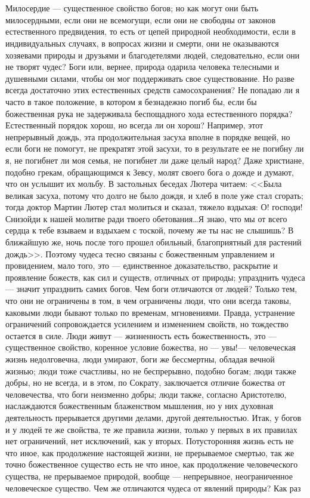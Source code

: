 \documentclass[12pt,oneside]{book}
\begin{document}
\chapter{}

Милосердие --- существенное свойство богов; но как могут они быть милосердными, если они не всемогущи, если они не свободны от законов естественного предвидения, то есть от цепей природной необходимости, если в индивидуальных случаях, в вопросах жизни и смерти, они не оказываются хозяевами природы и друзьями и благодетелями людей, следовательно, если они не творят чудес? Боги или, вернее, природа одарила человека телесными и душевными силами, чтобы он мог поддерживать свое существование. Но разве всегда достаточно этих естественных средств самосохранения? Не попадаю ли я часто в такое положение, в котором я безнадежно погиб бы, если бы божественная рука не задерживала беспощадного хода естественного порядка? Естественный порядок хорош, но всегда ли он хорош? Например, этот непрерывный дождь, эта продолжительная засуха вполне в порядке вещей, но если боги не помогут, не прекратят этой засухи, то в результате ее не погибну ли я, не погибнет ли моя семья, не погибнет ли даже целый народ? Даже христиане, подобно грекам, обращающимся к Зевсу, молят своего бога о дожде и думают, что он услышит их мольбу. В застольных беседах Лютера читаем: <<Была великая засуха, потому что долго не было дождя, и хлеб в поле уже стал сгорать; тогда доктор Мартин Лютер стал молиться и сказал, тяжело вздыхая: О! господи! Снизойди к нашей молитве ради твоего обетования\dots Я знаю, что мы от всего сердца к тебе взываем и вздыхаем с тоской, почему же ты нас не слышишь? В ближайшую же, ночь после того прошел обильный, благоприятный для растений дождь>>. Поэтому чудеса тесно связаны с божественным управлением и провидением, мало того, это --- единственное доказательство, раскрытие и проявление божеств, как сил и существ, отличных от природы; упразднить чудеса --- значит упразднить самих богов. Чем боги отличаются от людей? Только тем, что они не ограничены в том, в чем ограничены люди, что они всегда таковы, каковыми люди бывают только по временам, мгновениями. Правда, устранение ограничений сопровождается усилением и изменением свойств, но тождество остается в силе. Люди живут --- жизненность есть божественность, это --- существенное свойство, коренное условие божества, но --- увы!--- человеческая жизнь недолговечна, люди умирают, боги же бессмертны, обладая вечной жизнью; люди тоже счастливы, но не беспрерывно, подобно богам; люди также добры, но не всегда, и в этом, по Сократу, заключается отличие божества от человечества, что боги неизменно добры; люди также, согласно Аристотелю, наслаждаются божественным блаженством мышления, но у них духовная деятельность прерывается другими делами, другой деятельностью. Итак, у богов и у людей те же свойства, те же правила жизни, только у первых в их правилах нет ограничений, нет исключений, как у вторых. Потусторонняя жизнь есть не что иное, как продолжение настоящей жизни, не прерываемое смертью, так же точно божественное существо есть не что иное, как продолжение человеческого существа, не прерываемое природой, вообще --- непрерывное, неограниченное человеческое существо. Чем же отличаются чудеса от явлений природы? Как раз 
\end{document}
